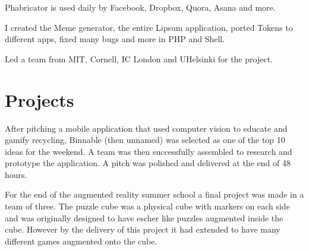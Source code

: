 \documentclass[a4paper]{deedy-resume} %
\begin{document}
\begin{minipage}[t]{0.66\textwidth}
\sectionspace %



\begin{tightitemize}
\item Phabricator is used daily by Facebook, Dropbox, Quora, Asana and more.
\item I created the Meme generator, the entire Lipsum application, ported Tokens to different apps, fixed many bugs and more in PHP and Shell.
\item Led a team from MIT, Cornell, IC London and UHelsinki for the project.
\end{tightitemize}

\sectionspace %


\section{Projects}


After pitching a mobile application that used computer vision to educate and gamify recycling, Binnable (then unnamed) was selected as one of the top 10 ideas for the weekend. A team was then successfully assembled to research and prototype the application. A pitch was polished and delivered at the end of 48 hours.

\sectionspace %



For the end of the augmented reality summer school a final project was made in a team of three. The puzzle cube was a physical cube with markers on each side and was originally designed to have escher like puzzles augmented inside the cube. However by the delivery of this project it had extended to have many different games augmented onto the cube.


\end{minipage}
\end{document}
